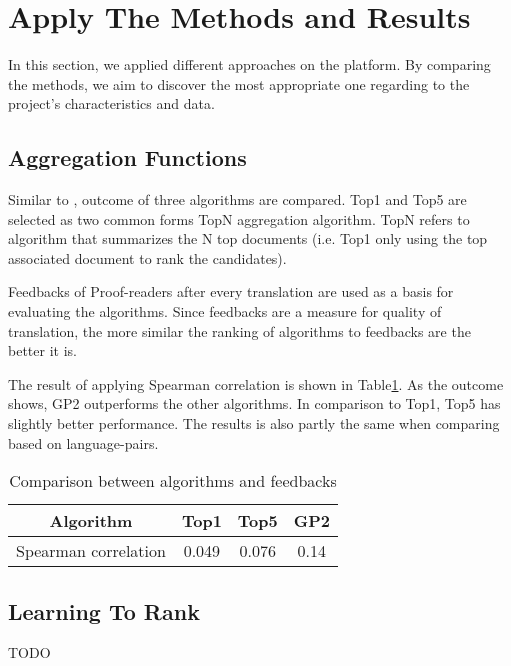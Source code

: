 \section{Apply The Methods and Results}
\label{sec:apply}
In this section, we applied different approaches on the platform. By comparing the methods, we aim to discover the most appropriate one regarding to the project's characteristics and data.

\subsection{Aggregation Functions}
Similar to \cite{agg-gp2}, outcome of three algorithms are compared. Top1 and Top5 are selected as two common forms TopN aggregation algorithm. TopN refers to algorithm that summarizes the N top documents (i.e. Top1 only using the top associated document to rank the candidates).

Feedbacks of Proof-readers after every translation are used as a basis for evaluating the algorithms. Since feedbacks are a measure for quality of translation, the more similar the ranking of algorithms to feedbacks are the better it is.

The result of applying Spearman correlation is shown in Table\ref{table:Spearman}. As the outcome shows, GP2 outperforms the other algorithms. In comparison to Top1, Top5 has slightly better performance. The results is also partly the same when comparing based on language-pairs.

\begin{table}
\begin{center}
\begin{tabular}{|c|c|c|c|}
\hline Algorithm & Top1 & Top5 & GP2  \\
\hline Spearman correlation & 0.049 & 0.076 & 0.14\\
\hline
\end{tabular}
\caption{Comparison between algorithms and feedbacks}
\label{table:Spearman}
\end{center}
\end{table}

\subsection{Learning To Rank}
TODO